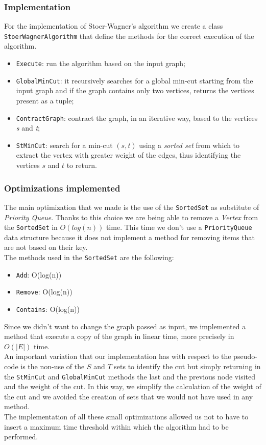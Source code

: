 \subsubsection{Implementation}
For the implementation of Stoer-Wagner's algorithm we create a class \verb|StoerWagnerAlgorithm| that define the methods for the correct execution of the algorithm.

\begin{itemize}
    \item \verb|Execute|: run the algorithm based on the input graph;
    \item \verb|GlobalMinCut|: it recursively searches for a global min-cut starting from the input graph and if the graph contains only two vertices, returns the vertices present as a tuple;
    \item \verb|ContractGraph|: contract the graph, in an iterative way, based to the vertices \textit{s} and \textit{t};
    \item \verb|StMinCut|: search for a min-cut \((s, t)\) using a \textit {sorted set} from which to extract the vertex with greater weight of the edges, thus identifying the vertices $s$ and $t$ to return.
\end{itemize}

\subsubsection{Optimizations implemented}
The main optimization that we made is the use of the \verb|SortedSet| as substitute of \textit{Priority Queue}. Thanks to this choice we are being able to remove a \textit{Vertex} from the \verb|SortedSet| in $O(log(n))$ time. This time we don't use a \verb|PriorityQueue| data structure because it does not implement a method for removing items that are not based on their key.\\
The methods used in the \verb|SortedSet| are the following:
\begin{itemize}
    \item \verb|Add|: O(log(n))
    \item \verb|Remove|: O(log(n))
    \item \verb|Contains|: O(log(n))
\end{itemize}
\noindent
Since we didn't want to change the graph passed as input, we implemented a method that execute a copy of the graph in linear time, more precisely in $O(|E|)$ time.\\ \noindent
An important variation that our implementation has with respect to the pseudo-code is the non-use of the $S$ and $T$ sets to identify the cut but simply returning in the \verb|StMinCut| and \verb|GlobalMinCut| methods the last and the previous node visited and the weight of the cut. In this way, we simplify the calculation of the weight of the cut and we avoided the creation of sets that we would not have used in any method. \\ \noindent
The implementation of all these small optimizations allowed us not to have to insert a maximum time threshold within which the algorithm had to be performed.

